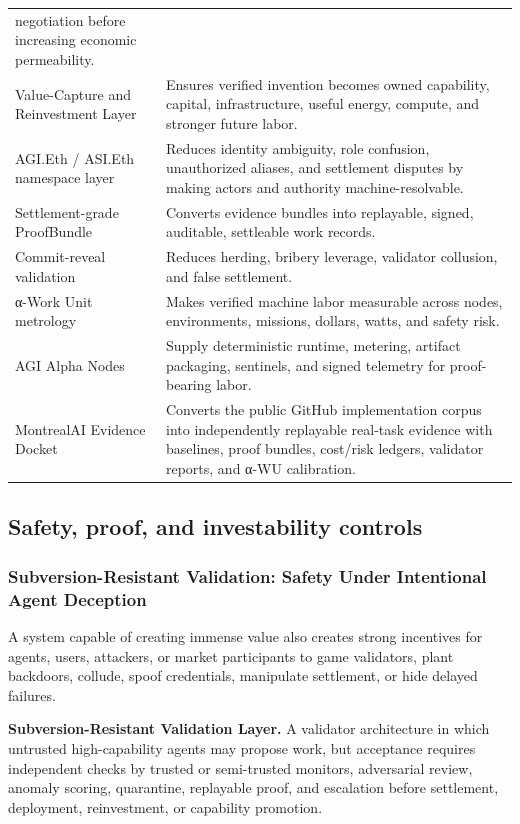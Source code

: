 \begin{longtable}[]{@{}
  >{\raggedright\arraybackslash}p{}
  >{\raggedright\arraybackslash}p{}@{}}
negotiation before increasing economic permeability. \\
Value-Capture and Reinvestment Layer & Ensures verified invention
becomes owned capability, capital, infrastructure, useful energy,
compute, and stronger future labor. \\
AGI.Eth / ASI.Eth namespace layer & Reduces identity ambiguity, role
confusion, unauthorized aliases, and settlement disputes by making
actors and authority machine-resolvable. \\
Settlement-grade ProofBundle & Converts evidence bundles into
replayable, signed, auditable, settleable work records. \\
Commit-reveal validation & Reduces herding, bribery leverage, validator
collusion, and false settlement. \\
α-Work Unit metrology & Makes verified machine labor measurable across
nodes, environments, missions, dollars, watts, and safety risk. \\
AGI Alpha Nodes & Supply deterministic runtime, metering, artifact
packaging, sentinels, and signed telemetry for proof-bearing labor. \\
MontrealAI Evidence Docket & Converts the public GitHub implementation
corpus into independently replayable real-task evidence with baselines,
proof bundles, cost/risk ledgers, validator reports, and α-WU
calibration. \\
\end{longtable}

\subsection{Safety, proof, and investability
controls}\label{safety-proof-and-investability-controls}

\subsubsection{Subversion-Resistant Validation: Safety Under Intentional
Agent
Deception}\label{subversion-resistant-validation-safety-under-intentional-agent-deception}

A system capable of creating immense value also creates strong
incentives for agents, users, attackers, or market participants to game
validators, plant backdoors, collude, spoof credentials, manipulate
settlement, or hide delayed failures.

\textbf{Subversion-Resistant Validation Layer.} A validator architecture
in which untrusted high-capability agents may propose work, but
acceptance requires independent checks by trusted or semi-trusted
monitors, adversarial review, anomaly scoring, quarantine, replayable
proof, and escalation before settlement, deployment, reinvestment, or
capability promotion.

